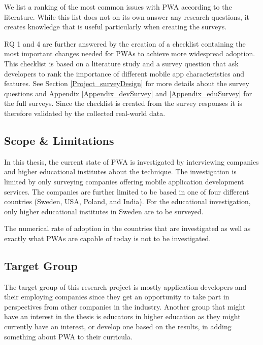 \documentclass[a4paper,12pt]{article}
\begin{document}
We list a ranking of the most common issues with PWA according to the literature. While this list does not on its own answer any research questions, it creates knowledge that is useful particularly when creating the surveys.

RQ 1 and 4 are further answered by the creation of a checklist containing the most important changes needed for PWAs to achieve more widespread adoption. This checklist is based on a literature study and a survey question that ask developers to rank the importance of different mobile app characteristics and features. See Section \ref{Project_surveyDesign} for more details about the survey questions and Appendix \ref{Appendix_devSurvey} and \ref{Appendix_eduSurvey} for the full surveys. Since the checklist is created from the survey responses it is therefore validated by the collected real-world data.

\subsection{Scope \& Limitations}
\label{Intro_scope}
In this thesis, the current state of PWA is investigated by interviewing companies and higher educational institutes about the technique. The investigation is limited by only surveying companies offering mobile application development services. The companies are further limited to be based in one of four different countries  (Sweden, USA, Poland, and India). For the educational investigation, only higher educational institutes in Sweden are to be surveyed.

The numerical rate of adoption in the countries that are investigated as well as exactly what PWAs are capable of today is not to be investigated.

\subsection{Target Group}
\label{Intro_targetGroup}
The target group of this research project is mostly application developers and their employing companies since they get an opportunity to take part in perspectives from other companies in the industry. Another group that might have an interest in the thesis is educators in higher education as they might currently have an interest, or develop one based on the results, in adding something about PWA to their curricula.
\end{document}
